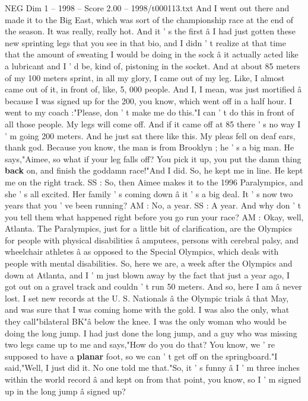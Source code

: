 \begin{textsample}{NEG Dim 1 – 1998 – Score 2.00 – 1998/t000113.txt}
And I went out there and made it to the Big East, which was sort of the championship race at the end of the season.
It was really, really hot.
And it ' s the first â I had just gotten these new sprinting legs that you see in that bio, and I didn ' t realize at that time that the amount of sweating I would be doing in the sock â it actually acted like a lubricant and I ' d be, kind of, pistoning in the socket.
And at about 85 meters of my 100 meters sprint, in all my glory, I came out of my leg.
Like, I almost came out of it, in front of, like, 5, 000 people.
And I, I mean, was just mortified â because I was signed up for the 200, you know, which went off in a half hour.
I went to my coach :"Please, don ' t make me do this."I can ' t do this in front of all those people.
My legs will come off.
And if it came off at 85 there ' s no way I ' m going 200 meters.
And he just sat there like this.
My pleas fell on deaf ears, thank god.
Because you know, the man is from Brooklyn ; he ' s a big man.
He says,"Aimee, so what if your leg falls off?
You pick it up, you put the damn thing \textbf{back} on, and finish the goddamn race!"And I did.
So, he kept me in line.
He kept me on the right track.
SS : So, then Aimee makes it to the 1996 Paralympics, and she ' s all excited.
Her family ' s coming down â it ' s a big deal.
It ' s now two years that you ' ve been running?
AM : No, a year.
SS : A year.
And why don ' t you tell them what happened right before you go run your race?
AM : Okay, well, Atlanta.
The Paralympics, just for a little bit of clarification, are the Olympics for people with physical disabilities â amputees, persons with cerebral palsy, and wheelchair athletes â as opposed to the Special Olympics, which deals with people with mental disabilities.
So, here we are, a week after the Olympics and down at Atlanta, and I ' m just blown away by the fact that just a year ago, I got out on a gravel track and couldn ' t run 50 meters.
And so, here I am â never lost.
I set new records at the U.
S.
Nationals â the Olympic trials â that May, and was sure that I was coming home with the gold.
I was also the only, what they call"bilateral BK"â below the knee.
I was the only woman who would be doing the long jump.
I had just done the long jump, and a guy who was missing two legs came up to me and says,"How do you do that?
You know, we ' re supposed to have a \textbf{planar} foot, so we can ' t get off on the springboard."I said,"Well, I just did it.
No one told me that."So, it ' s funny â I ' m three inches within the world record â and kept on from that point, you know, so I ' m signed up in the long jump â signed up?

\end{textsample}

